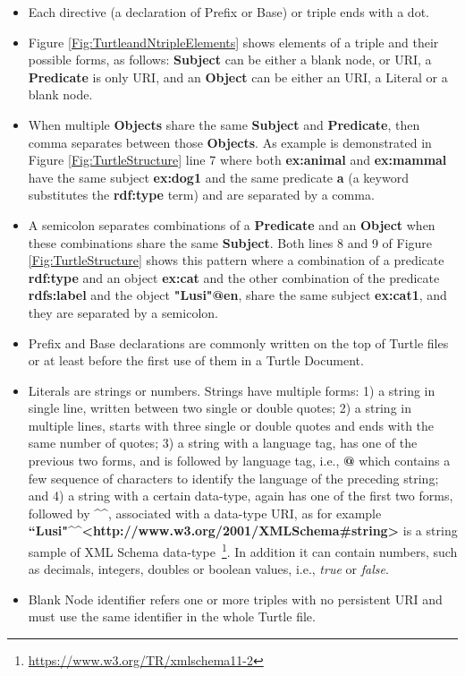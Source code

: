 \begin{itemize}
    \item Each directive (a declaration of Prefix or Base) or triple ends with a dot.
    \item Figure \ref{Fig:TurtleandNtripleElements} shows elements of a triple and their possible forms, as follows: \textbf{Subject} can be either a blank node, or URI, a \textbf{Predicate} is only URI, and an \textbf{Object} can be either an URI, a Literal or a blank node.
    \item When multiple \textbf{Objects} share the same \textbf{Subject} and \textbf{Predicate}, then comma separates between those \textbf{Objects}.
    As example is demonstrated in Figure \ref{Fig:TurtleStructure} line 7 where both \textbf{ex:animal} and \textbf{ex:mammal} have the same subject \textbf{ex:dog1} and the same predicate \textbf{a} (a keyword substitutes the \textbf{rdf:type} term) and are separated by a comma.
    
     \item A semicolon separates combinations of a \textbf{Predicate} and an \textbf{Object} when these combinations share the same \textbf{Subject}. 
     Both lines 8 and 9 of Figure \ref{Fig:TurtleStructure} shows this pattern where a combination of a predicate \textbf{rdf:type} and an object \textbf{ex:cat} and the other combination of the predicate \textbf{rdfs:label} and the object \textbf{"Lusi"@en}, share the same subject \textbf{ex:cat1}, and they are separated by a semicolon.
     
      \item Prefix and Base declarations are commonly written on the top of Turtle files or at least before the first use of them in a Turtle Document.
      
     \item Literals are strings or numbers. 
     Strings have multiple forms: 1) a string in single line, written between two single or double quotes; 2) a string in multiple lines, starts with three single or double quotes and ends with the same number of quotes; 3) a string with a language tag, has one of the previous two forms, and is followed by language tag, i.e., \textbf{@} which contains a few sequence of characters to identify the language of the preceding string; and 4) a string with a certain data-type, again has one of the first two forms, followed by \textbf{\textasciicircum\textasciicircum}, associated with a data-type URI, as for example \textbf{``Lusi"\textasciicircum\textasciicircum\textless http://www.w3.org/2001/XMLSchema\#string\textgreater} is a string sample of XML Schema data-type~\footnote{\url{https://www.w3.org/TR/xmlschema11-2}}.
     In addition it can contain numbers, such as decimals, integers, doubles or boolean values, i.e., \emph{true} or \emph{false}.
     \item Blank Node identifier refers one or more triples with no persistent URI and must use the same identifier in the whole Turtle file.   
     
     
\end{itemize} 

